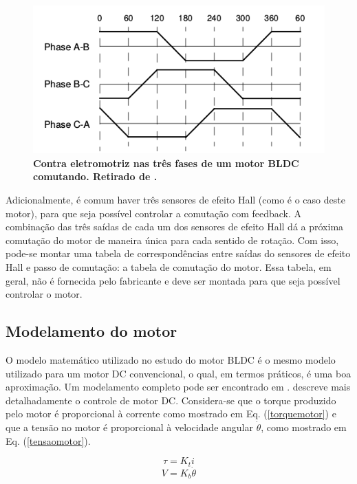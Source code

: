 \documentclass[10pt,fleqn,a4paper]{article}
\begin{document}
	\begin{figure}[ht]
		\begin{center}
			\includegraphics[angle=0, scale=0.5]{images/comutacao}
		\end{center}
		\caption{\textbf{Contra eletromotriz nas três fases de um motor BLDC comutando. Retirado de \cite{introducaobldc}.}}
		\label{fig:comutacao}
	\end{figure}
    
    
    Adicionalmente, é comum haver três sensores de efeito Hall (como é o caso deste motor), para que seja possível controlar a comutação com feedback. A combinação das três saídas de cada um dos sensores de efeito Hall dá a próxima comutação do motor de maneira única para cada sentido de rotação. Com isso, pode-se montar uma tabela de correspondências entre saídas do sensores de efeito Hall e passo de comutação: a tabela de comutação do motor. Essa tabela, em geral, não é fornecida pelo fabricante e deve ser montada para que seja possível controlar o motor.
    
    \subsection{Modelamento do motor}
    
    O modelo matemático utilizado no estudo do motor BLDC é o mesmo modelo utilizado para um motor DC convencional, o qual, em termos práticos, é uma boa aproximação. Um modelamento completo pode ser encontrado em \cite{modelomotor}. \cite{livrocarta} descreve mais detalhadamente o controle de motor DC. Considera-se que o torque produzido pelo motor é proporcional à corrente como mostrado em Eq. (\ref{torquemotor}) e que a tensão no motor é proporcional à velocidade angular $\dot{\theta}$, como mostrado em Eq. (\ref{tensaomotor}).
    
    \begin{equation}
    \tau = K_ti \label{torquemotor}
    \end{equation}
    \begin{equation}
    V = K_b\dot{\theta} \label{tensaomotor}
    \end{equation}
    
\end{document}
